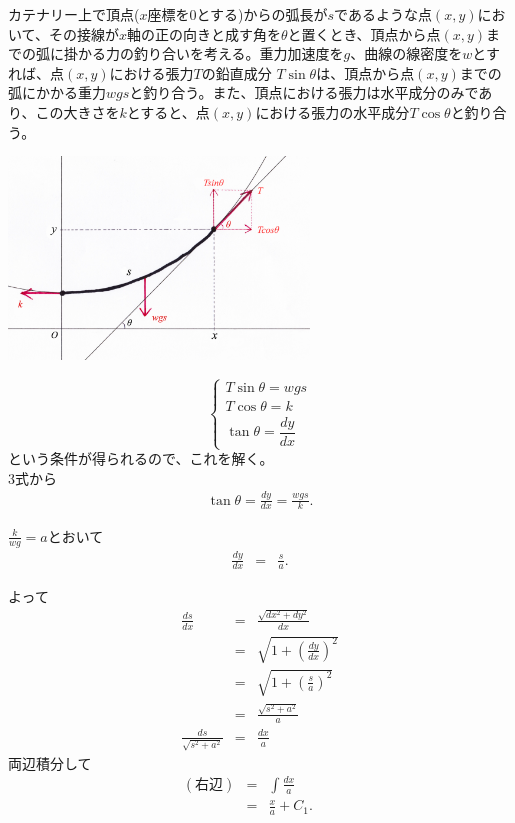 カテナリー上で頂点($x$座標を$0$とする)からの弧長が$s$であるような点$(x, y)$において、その接線が$x$軸の正の向きと成す角を$\theta$と置くとき、頂点から点$(x, y)$までの弧に掛かる力の釣り合いを考える。重力加速度を$g$、曲線の線密度を$w$とすれば、点$(x, y)$における張力$T$の鉛直成分 $T\sin{\theta}$は、頂点から点$(x, y)$までの弧にかかる重力$wgs$と釣り合う。また、頂点における張力は水平成分のみであり、この大きさを$k$とすると、点$(x,y)$における張力の水平成分$T\cos{\theta}$と釣り合う。
\begin{center}
  \includegraphics[width = 8cm]{nakayama/image/catenary2.JPG}
\end{center}
\vspace{-0.5zw}
\begin{displaymath}
\left\{
\begin{array}{l}
T\sin{\theta} = wgs \\
T\cos{\theta} = k \\
\tan{\theta} = \dfrac{dy}{dx}
\end{array}
\right.
\end{displaymath}
という条件が得られるので、これを解く。\\

3式から
\begin{eqnarray*}
\tan{\theta} = \frac{dy}{dx} = \frac{wgs}{k}.
\end{eqnarray*}

$\frac{k}{wg} = a$とおいて
\begin{eqnarray*}
\frac{dy}{dx} & = & \frac{s}{a}.
\end{eqnarray*}

よって
\begin{eqnarray*}
\frac{ds}{dx} & = & \frac{\sqrt{dx^2 + dy^2}}{dx} \\
& = & \sqrt{1 + \left(\frac{dy}{dx} \right)^2} \\
& = & \sqrt{1 + \left(\frac{s}{a} \right)^2} \\
& = & \frac{\sqrt{s^2 + a^2}}{a} \\
\frac{ds}{\sqrt{s^2 + a^2}} & = & \frac{dx}{a}
\end{eqnarray*}
両辺積分して
\begin{eqnarray*}
(右辺) & = & \int \frac{dx}{a}\qquad\quad \\
& = & \frac{x}{a} + C_1.
\end{eqnarray*}

